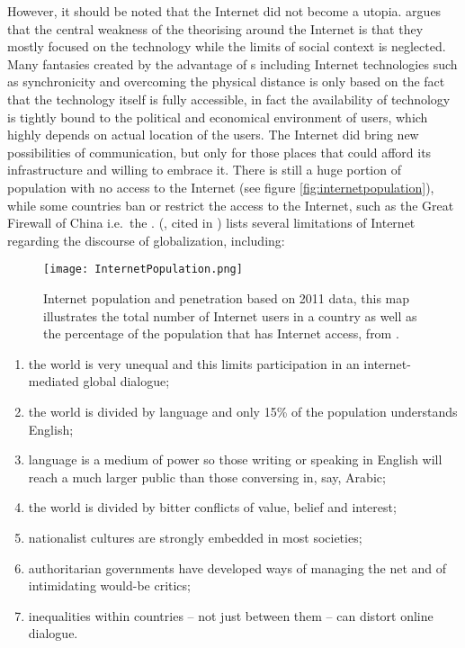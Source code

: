 However, it should be noted that the Internet did not become a utopia. \citet{curran_why_2012} argues that the central weakness of the theorising around the Internet is that they mostly focused on the technology while the limits of social context is neglected. Many fantasies created by the advantage of \ict s including Internet technologies such as synchronicity and overcoming the physical distance is only based on the fact that the technology itself is fully accessible, in fact the availability of technology is tightly bound to the political and economical environment of users, which highly depends on actual location of the users. The Internet did bring new possibilities of communication, but only for those places that could afford its infrastructure and willing to embrace it. There is still a huge portion of population with no access to the Internet (see figure \vref{fig:internetpopulation}), while some countries ban or restrict the access to the Internet, such as the Great Firewall of China i.e.\ the \gfw. \citeauthor{curran_misunderstanding_2012} (\citeyear{curran_misunderstanding_2012}, cited in \citealp{dencik_alternative_2013}) lists several limitations of Internet regarding the discourse of globalization, including:%
\begin{figure*}[!htbp]
	\centering
	\texttt{[image: InternetPopulation.png]}
	\caption[Internet population and penetration based on 2011 data]{Internet population and penetration based on 2011 data, this map illustrates the total number of Internet users in a country as well as the percentage of the population that has Internet access, from \citet{graham_internet_2013}.}
	\label{fig:internetpopulation}
\end{figure*}
\begin{enumerate}
	\item the world is very unequal and this limits participation in an internet-mediated global dialogue;
	\item the world is divided by language and only 15\% of the population understands English;
	\item language is a medium of power so those writing or speaking in English will reach a much larger public than those conversing in, say, Arabic;
	\item the world is divided by bitter conflicts of value, belief and interest;
	\item nationalist cultures are strongly embedded in most societies;
	\item authoritarian governments have developed ways of managing the net and of intimidating would-be critics;
	\item inequalities within countries – not just between them – can distort online dialogue.
\end{enumerate}
